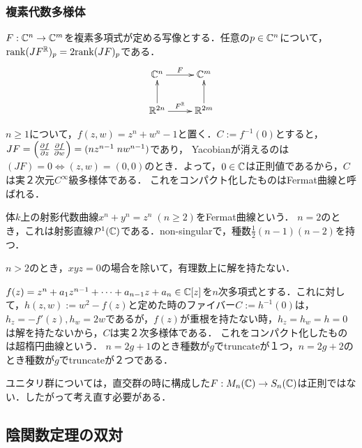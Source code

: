 \documentclass[uplatex,dvipdfmx]{jsreport}
\begin{document}
\subsubsection{複素代数多様体}

\begin{lemma}
    $F:\mathbb{C}^n\to\mathbb{C}^m$を複素多項式が定める写像とする．任意の$p\in\mathbb{C}^n$について，$\mathrm{rank}(JF^{\mathbb{R}})_p=2\mathrm{rank}(JF)_p$である．
    \[\xymatrix{
        \C^n\ar[r]^-{F}&\C^m\\
        \R^{2n}\ar[u]\ar[r]^-{F^\R}&\R^{2m}\ar[u]
    }\]
\end{lemma}

\begin{example}
    $n\ge 1$について，$f(z,w)=z^n+w^n-1$と置く．$C:=f^{-1}(0)$とすると，$JF=\left(\frac{\partial f}{\partial z}\;\frac{\partial f}{\partial w}\right)=(nz^{n-1}\;nw^{n-1})$であり，
    Yacobianが消えるのは$(JF)=0\Leftrightarrow (z,w)=(0,0)$のとき．よって，$0\in\mathbb{C}$は正則値であるから，$C$は実２次元$C^\infty$級多様体である．
    これをコンパクト化したものはFermat曲線と呼ばれる．
    \begin{definition}
        体$k$上の射影代数曲線$x^n+y^n=z^n\;(n\ge 2)$をFermat曲線という．
        $n=2$のとき，これは射影直線$\mathcal{P}^1(\mathbb{C})$である．non-singularで，種数$\frac{1}{2}(n-1)(n-2)$を持つ．
    \end{definition}
    \begin{theorem}
        $n>2$のとき，$xyz=0$の場合を除いて，有理数上に解を持たない．
    \end{theorem}
\end{example}

\begin{example}
    $f(z)=z^n+a_1z^{n-1}+\cdots+a_{n-1}z+a_n\in\mathbb{C}[z]$を$n$次多項式とする．これに対して，$h(z,w):=w^2-f(z)$と定めた時のファイバー$C:=h^{-1}(0)$は，
    $h_z=-f'(z),h_w=2w$であるが，$f(z)$が重根を持たない時，$h_z=h_w=h=0$は解を持たないから，$C$は実２次多様体である．
    これをコンパクト化したものは超楕円曲線という．
    $n=2g+1$のとき種数が$g$でtruncateが１つ，$n=2g+2$のとき種数が$g$でtruncateが２つである．
\end{example}

\begin{example}
    ユニタリ群については，直交群の時に構成した$F:M_n(\mathbb{C})\to S_n(\mathbb{C})$は正則ではない．したがって考え直す必要がある．
\end{example}

\subsection{陰関数定理の双対}
\end{document}
